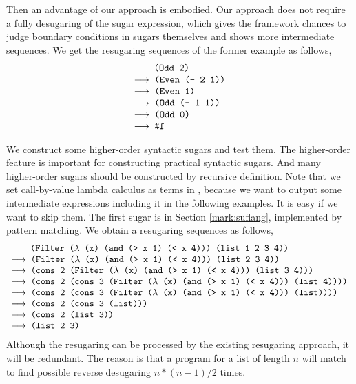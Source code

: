 Then an advantage of our approach is embodied. Our approach does not require a fully desugaring of the sugar expression, which gives the framework chances to judge boundary conditions in sugars themselves and shows more intermediate sequences. We get the resugaring sequences of the former example as follows,
\[
	\begin{array}{l}
		\quad\;\;\Code{ (Odd 2)}\\
		\OneStep{ \Code{ (Even (- 2 1))}}\\
		\OneStep{ \Code{ (Even 1)}}\\
		\OneStep{ \Code{ (Odd (- 1 1))}}\\
		\OneStep{ \Code{ (Odd 0)}}\\
		\OneStep{ \Code{ \#f}}
	\end{array}
\]

We construct some higher-order syntactic sugars and test them. The higher-order feature is important for constructing practical syntactic sugars. And many higher-order sugars should be constructed by recursive definition. Note that we set call-by-value lambda calculus as terms in , because we want to output some intermediate expressions including it in the following examples. It is easy if we want to skip them. The first sugar is  in Section \ref{mark:suflang}, implemented by pattern matching. We obtain a resugaring sequences as follows,
\[
	\begin{array}{l}
		\quad\;\;\Code{ (Filter ($\lambda$ (x) (and (> x 1) (< x 4))) (list 1 2 3 4))}\\
			\OneStep{ \Code{ (Filter ($\lambda$ (x) (and (> x 1) (< x 4))) (list 2 3 4))}}\\
			\OneStep{ \Code{ (cons 2 (Filter ($\lambda$ (x) (and (> x 1) (< x 4))) (list 3 4)))}}\\
			\OneStep{ \Code{ (cons 2 (cons 3 (Filter ($\lambda$ (x) (and (> x 1) (< x 4))) (list 4))))}}\\
			\OneStep{ \Code{ (cons 2 (cons 3 (Filter ($\lambda$ (x) (and (> x 1) (< x 4))) (list))))}}\\
			\OneStep{ \Code{ (cons 2 (cons 3 (list)))}}\\
			\OneStep{ \Code{ (cons 2 (list 3))}}\\
			\OneStep{ \Code{ (list 2 3)}}
	\end{array}
\]
Although the resugaring can be processed by the existing resugaring approach, it will be redundant. The reason is that a  program for a list of length $n$ will match to find possible reverse desugaring $n*(n-1)/2$ times.

